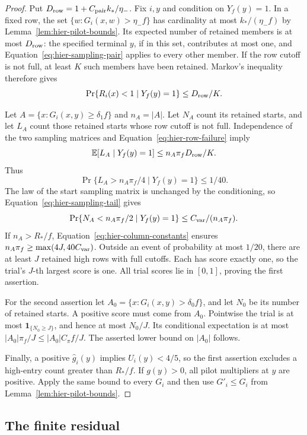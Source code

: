 \begin{proof}
Put $D_{\rm row}=1+C_{\rm pair}k_*/\eta_-$.
Fix $i,y$ and condition on $Y_f(y)=1$.  In a fixed row, the set
$\{w:G_i(x,w)>\eta_-f\}$ has cardinality at most
$k_*/(\eta_-f)$ by Lemma~\ref{lem:hier-pilot-bounds}.
Its expected number of retained members is at most $D_{\rm row}$:
the specified terminal $y$, if in this set, contributes at most one,
and Equation~\eqref{eq:hier-sampling-pair} applies to every other member.
If the row cutoff is not full, at least $K$ such members have been retained.
Markov's inequality therefore gives
\begin{equation}
 \Pr\{R_i(x)<1\mid Y_f(y)=1\}\leq D_{\rm row}/K.
 \label{eq:hier-row-failure}
\end{equation}

Let $A=\{x:G_i(x,y)\geq\delta_1f\}$ and $n_A=|A|$.
Let $N_A$ count its retained starts, and let $L_A$ count those retained
starts whose row cutoff is not full.  Independence of the two sampling matrices
and Equation~\eqref{eq:hier-row-failure} imply
\[
 \mathbb E[L_A\mid Y_f(y)=1]\leq n_A\pi_fD_{\rm row}/K.
\]
Thus
\[
 \Pr\{L_A>n_A\pi_f/4\mid Y_f(y)=1\}\leq1/40.
\]
The law of the start sampling matrix is unchanged by the conditioning, so
Equation~\eqref{eq:hier-sampling-tail} gives
\[
 \Pr\{N_A<n_A\pi_f/2\mid Y_f(y)=1\}
       \leq C_{\rm var}/(n_A\pi_f).
\]
If $n_A>R_*/f$, Equation~\eqref{eq:hier-column-constants} ensures
$n_A\pi_f\geq\max(4J,40C_{\rm var})$.  Outside an event of probability
at most $1/20$, there are at least $J$ retained high rows with full
cutoffs.  Each has score exactly one, so the trial's $J$-th largest score
is one.  All trial scores lie in $[0,1]$, proving the first assertion.

For the second assertion let
$A_0=\{x:G_i(x,y)>\delta_0f\}$, and let $N_0$ be its number of
retained starts.  A positive score must come from $A_0$.  Pointwise the
trial is at most $\mathbf 1_{\{N_0\geq J\}}$, and hence at most
$N_0/J$.  Its conditional expectation is at most
$|A_0|\pi_f/J\leq |A_0|C_\pi f/J$.  The asserted lower bound on
$|A_0|$ follows.

Finally, a positive $\widehat g_i(y)$ implies $U_i(y)<4/5$, so the
first assertion excludes a high-entry count greater than $R_*/f$.
If $g(y)>0$, all pilot multipliers at $y$ are positive.  Apply the
same bound to every $G_i$ and then use $G'_i\leq G_i$ from
Lemma~\ref{lem:hier-pilot-bounds}.
\end{proof}

\subsection{The finite residual}

